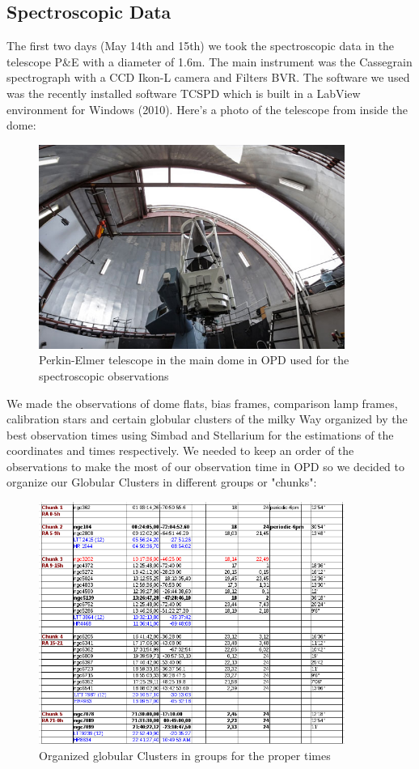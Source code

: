 \subsection{Spectroscopic Data}

The first two days (May 14th and 15th) we took the spectroscopic data in the telescope P\&E with a diameter of 1.6m. The main instrument was the Cassegrain spectrograph with a CCD Ikon-L camera and Filters BVR. The software we used was the recently installed software TCSPD which is built in a LabView environment for Windows (2010). Here's a photo of the telescope from inside the dome:

\begin{figure}[H]
\centering
\includegraphics[width=10cm]{images/opd-spectrograph.jpg}
\caption{Perkin-Elmer telescope in the main dome in OPD used for the spectroscopic observations}
\end{figure}

We made the observations of dome flats, bias frames, comparison lamp frames, calibration stars and certain globular clusters of the milky Way organized by the best observation times using Simbad and Stellarium for the estimations of the coordinates and times respectively. We needed to keep an order of the observations to make the most of our observation time in OPD so we decided to organize our Globular Clusters in different groups or "chunks":

\begin{figure}[H]
\centering
\includegraphics[width=10cm]{images/9.png}
\caption{Organized globular Clusters in groups for the proper times}
\end{figure}

